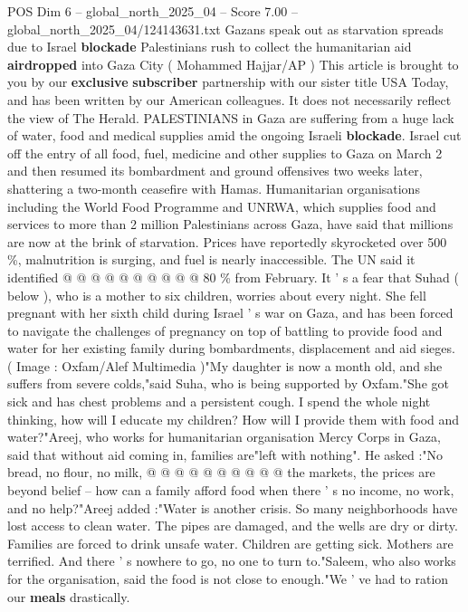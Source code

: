 \begin{textsample}{POS Dim 6 – global\_north\_2025\_04 – Score 7.00 – global\_north\_2025\_04/124143631.txt}  \label{ex:f6_pos_191}
Gazans speak out as starvation spreads due to Israel \textbf{blockade} Palestinians rush to collect the humanitarian aid \textbf{airdropped} into Gaza City ( Mohammed Hajjar/AP ) This article is brought to you by our \textbf{exclusive} \textbf{subscriber} partnership with our sister title USA Today, and has been written by our American colleagues.
It does not necessarily reflect the view of The Herald.
PALESTINIANS in Gaza are suffering from a huge lack of water, food and medical supplies amid the ongoing Israeli \textbf{blockade}.
Israel cut off the entry of all food, fuel, medicine and other supplies to Gaza on March 2 and then resumed its bombardment and ground offensives two weeks later, shattering a two-month ceasefire with Hamas.
Humanitarian organisations including the World Food Programme and UNRWA, which supplies food and services to more than 2 million Palestinians across Gaza, have said that millions are now at the brink of starvation.
Prices have reportedly skyrocketed over 500 \%, malnutrition is surging, and fuel is nearly inaccessible.
The UN said it identified @ @ @ @ @ @ @ @ @ @ 80 \% from February.
It ' s a fear that Suhad ( below ), who is a mother to six children, worries about every night.
She fell pregnant with her sixth child during Israel ' s war on Gaza, and has been forced to navigate the challenges of pregnancy on top of battling to provide food and water for her existing family during bombardments, displacement and aid sieges. ( Image : Oxfam/Alef Multimedia )"My daughter is now a month old, and she suffers from severe colds,"said Suha, who is being supported by Oxfam."She got sick and has chest problems and a persistent cough.
I spend the whole night thinking, how will I educate my children?
How will I provide them with food and water?"Areej, who works for humanitarian organisation Mercy Corps in Gaza, said that without aid coming in, families are"left with nothing".
He asked :"No bread, no flour, no milk, @ @ @ @ @ @ @ @ @ @ the markets, the prices are beyond belief -- how can a family afford food when there ' s no income, no work, and no help?"Areej added :"Water is another crisis.
So many neighborhoods have lost access to clean water.
The pipes are damaged, and the wells are dry or dirty.
Families are forced to drink unsafe water.
Children are getting sick.
Mothers are terrified.
And there ' s nowhere to go, no one to turn to."Saleem, who also works for the organisation, said the food is not close to enough."We ' ve had to ration our \textbf{meals} drastically.

\end{textsample}

